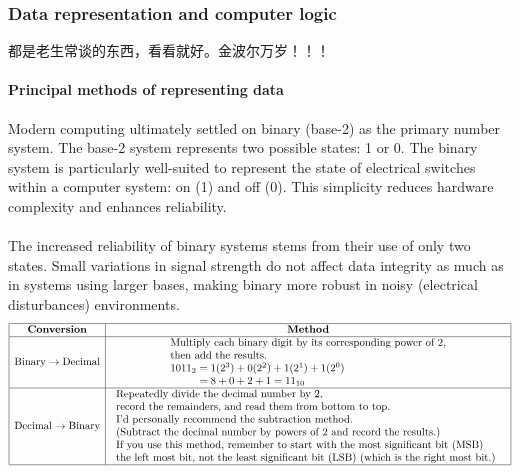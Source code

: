 \subsubsection{Data representation and computer logic}
都是老生常谈的东西，看看就好。金波尔万岁！！！
\paragraph{Principal methods of representing data}
Modern computing ultimately settled on binary (base-2) as the primary number system. The base-2 system represents two possible states: 1 or 0. The binary system is particularly well-suited to represent the state of electrical switches within a computer system: on (1) and off (0). This simplicity reduces hardware complexity and enhances reliability. \\\\
The increased reliability of binary systems stems from their use of only two states. Small 
variations in signal strength do not affect data integrity as much as in systems using larger bases, making binary more robust in noisy (electrical disturbances) environments. 
\[
\begin{array}{|c|c|}
\hline
\textbf{Conversion} & \textbf{Method} \\ \hline

\text{Binary} \rightarrow \text{Decimal}
&
\begin{array}{l}
\text{Multiply each binary digit by its corresponding power of }2,\\
\text{then add the results.}\\
1011_2 = 1(2^3)+0(2^2)+1(2^1)+1(2^0)\\
\phantom{1011_2}=8+0+2+1=11_{10}
\end{array}
\\ \hline

\text{Decimal} \rightarrow \text{Binary}
&
\begin{array}{l}
\text{Repeatedly divide the decimal number by }2,\\
\text{record the remainders, and read them from bottom to top.}\\
\text{I'd personally recommend the subtraction method.}\\
\text{(Subtract the decimal number by powers of 2 and record the results.)}\\
\text{If you use this method, remember to start with the most significant bit (MSB)}\\\text{the left most bit, not the least significant bit (LSB) (which is the right most bit.) }
\end{array}
\\ \hline

\end{array}
\]
